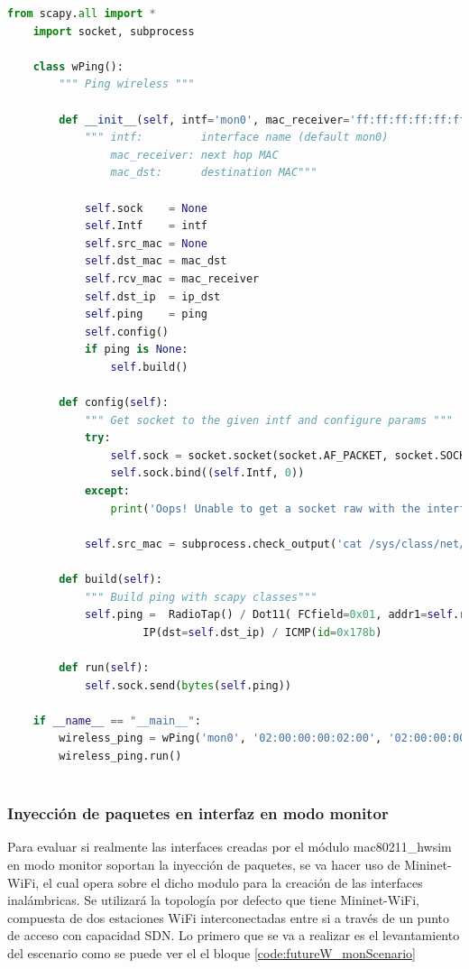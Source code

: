 \begin{lstlisting}[language=Python, style=Python-color, caption={Herramienta wping},label=code:futureW_wping]
    from scapy.all import *
    import socket, subprocess
    
    class wPing():
    	""" Ping wireless """
    
    	def __init__(self, intf='mon0', mac_receiver='ff:ff:ff:ff:ff:ff', mac_dst='ff:ff:ff:ff:ff:ff', ip_dst=None, ping=None):
    		""" intf:         interface name (default mon0)
    		    mac_receiver: next hop MAC
    		    mac_dst:	  destination MAC"""
    	
    		self.sock    = None
    		self.Intf    = intf
    		self.src_mac = None
    		self.dst_mac = mac_dst
    		self.rcv_mac = mac_receiver
    		self.dst_ip  = ip_dst
    		self.ping    = ping
    		self.config()
    		if ping is None:
    			self.build()
    		
    	def config(self):
    		""" Get socket to the given intf and configure params """
    		try:
    			self.sock = socket.socket(socket.AF_PACKET, socket.SOCK_RAW)
    			self.sock.bind((self.Intf, 0))
    		except:
    			print('Oops! Unable to get a socket raw with the interface - ' + self.Intf)
    		
    		self.src_mac = subprocess.check_output('cat /sys/class/net/'+self.Intf+'/address', stderr=subprocess.STDOUT, shell=True).decode('utf-8').split("\n")[0]
    
    	def build(self):
    		""" Build ping with scapy classes"""
    		self.ping =  RadioTap() / Dot11( FCfield=0x01, addr1=self.rcv_mac, addr2=self.src_mac, addr3=self.dst_mac, addr4=self.src_mac) / LLC() / SNAP() / \
    			     IP(dst=self.dst_ip) / ICMP(id=0x178b)
    
    	def run(self):
    		self.sock.send(bytes(self.ping))
    
    if __name__ == "__main__":
    	wireless_ping = wPing('mon0', '02:00:00:00:02:00', '02:00:00:00:01:00', '10.0.0.2')
    	wireless_ping.run()
	
\end{lstlisting}

\subsubsection{Inyección de paquetes en interfaz en modo monitor}

Para evaluar si realmente las interfaces creadas por el módulo mac80211\_hwsim en modo monitor soportan la inyección de paquetes, se va hacer uso de Mininet-WiFi, el cual opera sobre el dicho modulo para la creación de las interfaces inalámbricas. Se utilizará la topología por defecto que tiene Mininet-WiFi, compuesta de dos estaciones WiFi interconectadas entre si a través de un punto de acceso con capacidad SDN. Lo primero que se va a realizar es el levantamiento del escenario como se puede ver el el bloque \ref{code:futureW_monScenario}

